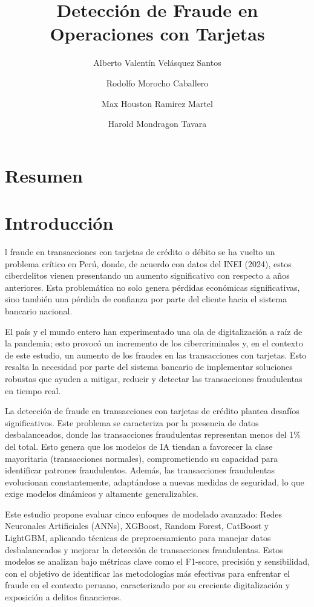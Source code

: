 \documentclass[9pt,a4paper,twoside]{rho-class/rho}
\title{ Detección de Fraude en Operaciones con Tarjetas}
\author[,$\dagger$]{Alberto Valentín Velásquez Santos}
\author[,$\dagger$]{Rodolfo Morocho Caballero}
\author[,$\dagger$]{Max Houston Ramirez Martel}
\author[,$\dagger$]{Harold Mondragon Tavara}
\affil[$\dagger$]{Estos autores contribuyeron igualmente a este trabajo.}
\begin{document}
	
    \maketitle
    \section{Resumen}
    \section{Introducción}

        l fraude en transacciones con tarjetas de crédito o débito se ha vuelto un problema crítico en Perú, donde, de acuerdo con datos del INEI (2024), estos ciberdelitos vienen presentando un aumento significativo con respecto a años anteriores. Esta problemática no solo genera pérdidas económicas significativas, sino también una pérdida de confianza por parte del cliente hacia el sistema bancario nacional.

        El país y el mundo entero han experimentado una ola de digitalización a raíz de la pandemia; esto provocó un incremento de los cibercriminales y, en el contexto de este estudio, un aumento de los fraudes en las transacciones con tarjetas. Esto resalta la necesidad por parte del sistema bancario de implementar soluciones robustas que ayuden a mitigar, reducir y detectar las transacciones fraudulentas en tiempo real. 
        
        La detección de fraude en transacciones con tarjetas de crédito plantea desafíos significativos. Este problema se caracteriza por la presencia de datos desbalanceados, donde las transacciones fraudulentas representan menos del 1\% del total. Esto genera que los modelos de IA tiendan a favorecer la clase mayoritaria (transacciones normales), comprometiendo su capacidad para identificar patrones fraudulentos. Además, las transacciones fraudulentas evolucionan constantemente, adaptándose a nuevas medidas de seguridad, lo que exige modelos dinámicos y altamente generalizables. 
        
        Este estudio propone evaluar cinco enfoques de modelado avanzado: Redes Neuronales Artificiales (ANNs), XGBoost, Random Forest, CatBoost y LightGBM, aplicando técnicas de preprocesamiento para manejar datos desbalanceados y mejorar la detección de transacciones fraudulentas. Estos modelos se analizan bajo métricas clave como el F1-score, precisión y sensibilidad, con el objetivo de identificar las metodologías más efectivas para enfrentar el fraude en el contexto peruano, caracterizado por su creciente digitalización y exposición a delitos financieros.
        
\end{document}
